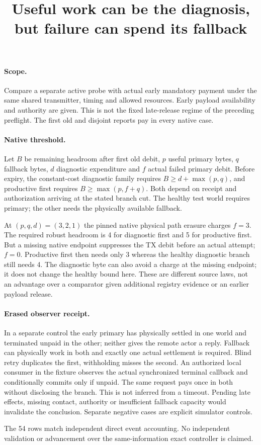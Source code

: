 \documentclass[11pt]{article}
\title{Useful work can be the diagnosis, but failure can spend its fallback}
\date{}
\begin{document}
\maketitle
\paragraph{Scope.}
Compare a separate active probe with actual early mandatory payment
under the same shared transmitter, timing and allowed resources.
Early payload availability and authority are given. This is not
the fixed late-release regime of the preceding preflight. The
first old and disjoint reports pay in every native case.

\paragraph{Native threshold.}
Let $B$ be remaining headroom after first old debit, $p$ useful
primary bytes, $q$ fallback bytes, $d$ diagnostic expenditure and
$f$ actual failed primary debit. Before expiry, the constant-cost
diagnostic family requires $B\ge d+\max(p,q)$, and productive first
requires $B\ge \max(p,f+q)$. Both depend on receipt and authorization
arriving at the stated branch cut. The healthy test world requires
primary; the other needs the physically available fallback.

At $(p,q,d)=(3,2,1)$ the pinned native physical path erasure charges
$f=3$. The required robust headroom is 4 for diagnostic first and
5 for productive first. But a missing native endpoint suppresses
the TX debit before an actual attempt; $f=0$. Productive first
then needs only 3 whereas the healthy diagnostic branch still
needs 4. The diagnostic byte can also avoid a charge at the missing
endpoint; it does not change the healthy bound here. These are
different source laws, not an advantage over a comparator given
additional registry evidence or an earlier payload release.

\paragraph{Erased observer receipt.}
In a separate control the early primary has physically settled in
one world and terminated unpaid in the other; neither gives the
remote actor a reply. Fallback can physically work in both and
exactly one actual settlement is required. Blind retry duplicates
the first, withholding misses the second. An authorized local
consumer in the fixture observes the actual synchronized terminal
callback and conditionally commits only if unpaid. The same
request pays once in both without disclosing the branch. This is
not inferred from a timeout. Pending late effects, missing contact,
authority or insufficient fallback capacity would invalidate the
conclusion. Separate negative cases are explicit simulator controls.

The 54 rows match independent direct event accounting. No
independent validation or advancement over the same-information
exact controller is claimed.
\end{document}
